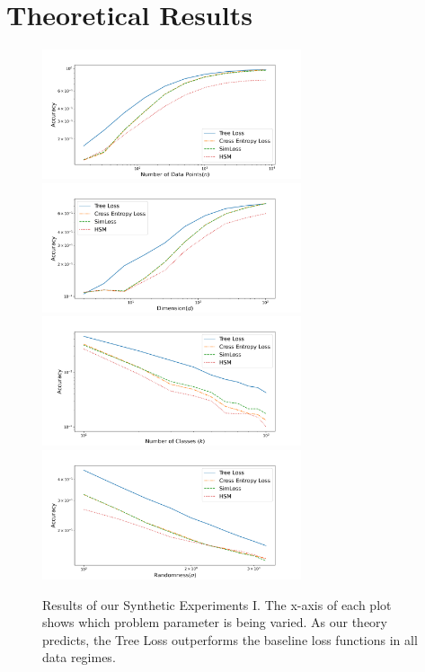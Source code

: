 \documentclass[twoside]{article}
\begin{document}

\section{Theoretical Results}
\label{sec:theory}



\begin{figure}
\includegraphics[width=\columnwidth,height=1.5in]{fig/images/accuracy_vs_n.png}
\includegraphics[width=\columnwidth,height=1.5in]{fig/images/accuracy_vs_d.png}
\includegraphics[width=\columnwidth,height=1.5in]{fig/images/accuracy_vs_class.png}
\includegraphics[width=\columnwidth,height=1.5in]{fig/images/accuracy_vs_sigma.png}
\caption{
    Results of our Synthetic Experiments I.
    The x-axis of each plot shows which problem parameter is being varied.
    As our theory predicts, the Tree Loss outperforms the baseline loss functions in all data regimes.
}
\label{fig:synth:1}
\end{figure}
\end{document}
